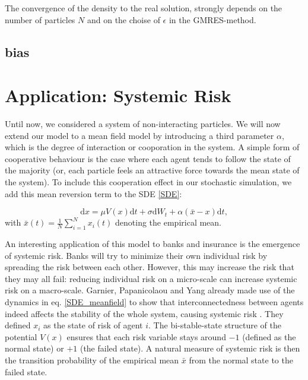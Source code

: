 \documentclass[]{article}
\newcommand{\dd}{\ensuremath{\mathrm{d}}}
\theoremstyle{definition}
\begin{document}
%


The convergence of the density to the real solution, strongly depends on the number of particles $N$ and on the choise of $\epsilon$ in the GMRES-method. 



\subsection{}



\subsection{bias}


\section{Application: Systemic Risk}


Until now, we considered a system of non-interacting particles. We will now extend our model to a mean field model by introducing a third parameter $\alpha$, which is the degree of interaction or cooporation in the system. A simple form of cooperative behaviour is the case where each agent tends to follow the state of the majority (or, each particle feels an attractive force towards the mean state of the system). To include this cooperation effect in our stochastic simulation, we add this mean reversion term to the SDE \eqref{SDE}:

\begin{equation} 
\label{SDE_meanfield}
    \dd x = \mu V(x) \dd t + \sigma  \dd{W_t} + \alpha(\bar{x} -x) \dd t ,
\end{equation}
with  $\bar{x}(t) = \frac{1}{N} \sum_{i=1}^{N} x_i(t)$ denoting the empirical mean. 


An interesting application of this model to banks and insurance is the emergence of systemic risk.  Banks will try to minimize their own individual risk by spreading the risk between each other. However, this may increase the risk that they may all fail: reducing individual risk on a micro-scale can increase systemic risk on a macro-scale. 
Garnier, Papanicolaou and Yang already made use of the dynamics in eq. \eqref{SDE_meanfield}  to show that interconnectedness between agents indeed affects the stability of the whole system, causing systemic risk  \cite{Garnier}. They defined $x_i$  as the state of risk of agent $i$. The bi-stable-state structure of the potential $V(x)$ ensures that each risk variable stays around $-1$ (defined as the normal state) or $+1$ (the failed state).  A natural measure of systemic risk is then the transition probability of the empirical mean $\bar{x}$ from the normal state to the failed state. 
 
\end{document}
